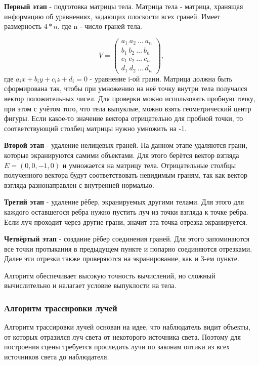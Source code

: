 \textbf{Первый этап} - подготовка матрицы тела. Матрица тела - матрица, хранящая информацию об уравнениях, задающих плоскости всех граней. Имеет размерность $4*n$, где n - число граней тела.

\begin{equation}
	\label{eq:body_matrix}
	V = \begin{pmatrix}
		a_1\ a_2\ \dots\ a_n \\
		b_1\ b_2\ \dots\ b_n \\
		c_1\ c_2\ \dots\ c_n \\
		d_1\ d_2\ \dots\ d_n 
	\end{pmatrix},
\end{equation}
где $ a_ix + b_iy + c_iz + d_i = 0 $ - уравнение i-ой грани. Матрица должна быть сформирована так, чтобы при умножению на неё точку внутри тела получался вектор положительных чисел. Для проверки можно использовать пробную точку, при этом с учётом того, что тела выпуклые, можно взять геометрический центр фигуры. Если какое-то значение вектора отрицательно для пробной точки, то соответствующий столбец матрицы нужно умножить на -1.

\textbf{Второй этап} - удаление нелицевых граней. На данном этапе удаляются грани, которые экранируются самими объектами. Для этого берётся вектор взгляда $E = (0, 0,-1, 0)$ и умножается на матрицу тела. Отрицательные столбцы полученного вектора будут соответствовать невидимым граням, так как вектор взгляда разнонаправлен с внутренней нормалью.

\textbf{Третий этап} - удаление рёбер, экранируемых другими телами. Для этого для каждого оставшегося ребра нужно пустить луч из точки взгляда к точке ребра. Если луч проходит через другие грани, значит эта точка отрезка экранируется. 

\textbf{Четвёртый этап} - создание рёбер соединения граней. Для этого запоминаются все точки протыкания в предыдущем пункте и попарно соединяются отрезками. Далее эти отрезки также проверяются на экранирование, как и 3-ем пункте.

Алгоритм обеспечивает высокую точность вычислений, но сложный вычислительно и налагает условие выпуклости на тела.


\subsubsection{Алгоритм трассировки лучей}

Алгоритм трассировки лучей основан на идее, что наблюдатель видит объекты, от которых отразился луч света от некоторого источника света. Поэтому для построения сцены требуется проследить лучи по законам оптики из всех источников света до наблюдателя.

